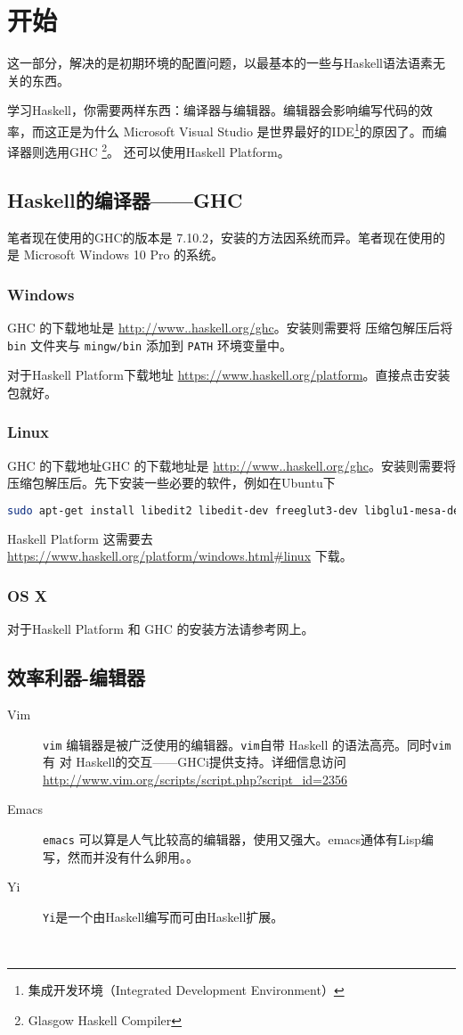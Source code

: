 
\chapter{开始}
这一部分，解决的是初期环境的配置问题，以最基本的一些与Haskell语法语素无关的东西。

学习Haskell，你需要两样东西：编译器与编辑器。编辑器会影响编写代码的效率，而这正是为什么 Microsoft Visual Studio 是世界最好的IDE\footnote{集成开发环境（Integrated Development Environment）}的原因了。而编译器则选用GHC \footnote{Glasgow Haskell Compiler}。
还可以使用Haskell Platform。
\section{Haskell的编译器——GHC}
笔者现在使用的GHC的版本是 7.10.2，安装的方法因系统而异。笔者现在使用的是 Microsoft Windows 10 Pro 的系统。
\subsection{Windows}
GHC 的下载地址是 \url{http://www..haskell.org/ghc}。安装则需要将 压缩包解压后将 \verb"bin" 文件夹与 \verb"mingw/bin" 添加到 \verb"PATH" 环境变量中。

对于Haskell Platform下载地址 \url{https://www.haskell.org/platform}。直接点击安装包就好。
\subsection{Linux}
GHC 的下载地址GHC 的下载地址是 \url{http://www..haskell.org/ghc}。安装则需要将压缩包解压后。先下安装一些必要的软件，例如在Ubuntu下
\begin{lstlisting}[language=bash]
	sudo apt-get install libedit2 libedit-dev freeglut3-dev libglu1-mesa-dev libgmp3-dev
\end{lstlisting}

Haskell Platform 这需要去 \url{https://www.haskell.org/platform/windows.html#linux} 下载。
\subsection{OS X}
对于Haskell Platform 和 GHC 的安装方法请参考网上。

\section{效率利器-编辑器}
\begin{description}
  \item[Vim]\verb"vim" 编辑器是被广泛使用的编辑器。\verb"vim"自带 Haskell 的语法高亮。同时\verb"vim" 有 对 Haskell的交互——GHCi提供支持。详细信息访问\url{http://www.vim.org/scripts/script.php?script_id=2356}   
  \item[Emacs]\verb"emacs" 可以算是人气比较高的编辑器，使用又强大。emacs通体有Lisp编写，然而并没有什么卵用。。
  \item[Yi]\verb"Yi"是一个由Haskell编写而可由Haskell扩展。
  \item[] 
\end{description}
\endinput 